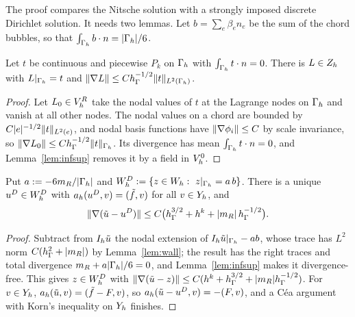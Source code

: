 The proof compares the Nitsche solution with a strongly imposed discrete Dirichlet solution. It needs two lemmas. Let $b=\sum_e\beta_en_e$ be the sum of the chord bubbles, so that $\int_{\Gamma_h}b\cdot n=|\Gamma_h|/6$.

\begin{lemma}\label{lem:lift}
Let $t$ be continuous and piecewise $P_k$ on $\Gamma_h$ with $\int_{\Gamma_h}t\cdot n=0$. There is $L\in Z_h$ with $L|_{\Gamma_h}=t$ and $\lVert \nabla L\rVert\le Ch_\Gamma^{-1/2}\lVert t\rVert_{L^2(\Gamma_h)}$.
\end{lemma}

\begin{proof}
Let $L_0\in V_h^R$ take the nodal values of $t$ at the Lagrange nodes on $\Gamma_h$ and vanish at all other nodes. The nodal values on a chord are bounded by $C|e|^{-1/2}\lVert t\rVert_{L^2(e)}$, and nodal basis functions have $\lVert \nabla\phi_i\rVert\le C$ by scale invariance, so $\lVert \nabla L_0\rVert\le Ch_\Gamma^{-1/2}\lVert t\rVert_{\Gamma_h}$. Its divergence has mean $\int_{\Gamma_h}t\cdot n=0$, and Lemma~\ref{lem:infsup} removes it by a field in $V_h^0$.
\end{proof}

\begin{lemma}\label{lem:dir}
Put $a:=-6m_R/|\Gamma_h|$ and $W_h^D:=\{z\in W_h:\ z|_{\Gamma_h}=a\,b\}$. There is a unique $u^D\in W_h^D$ with $a_h(u^D,v)=(\tilde f,v)$ for all $v\in Y_h$, and
\[
\lVert \nabla(\tilde u-u^D)\rVert\le C\bigl(h_\Gamma^{3/2}+h^k+|m_R|\,h_\Gamma^{-1/2}\bigr).
\]
\end{lemma}

\begin{proof}
Subtract from $I_h\tilde u$ the nodal extension of $I_h\tilde u|_{\Gamma_h}-ab$, whose trace has $L^2$ norm $C(h_\Gamma^2+|m_R|)$ by Lemma~\ref{lem:wall}; the result has the right traces and total divergence $m_R+a|\Gamma_h|/6=0$, and Lemma~\ref{lem:infsup} makes it divergence-free. This gives $z\in W_h^D$ with $\lVert \nabla(\tilde u-z)\rVert\le C(h^k+h_\Gamma^{3/2}+|m_R|h_\Gamma^{-1/2})$. For $v\in Y_h$, $a_h(\tilde u,v)=(\tilde f-F,v)$, so $a_h(\tilde u-u^D,v)=-(F,v)$, and a C\'ea argument with Korn's inequality on $Y_h$ finishes.
\end{proof}

